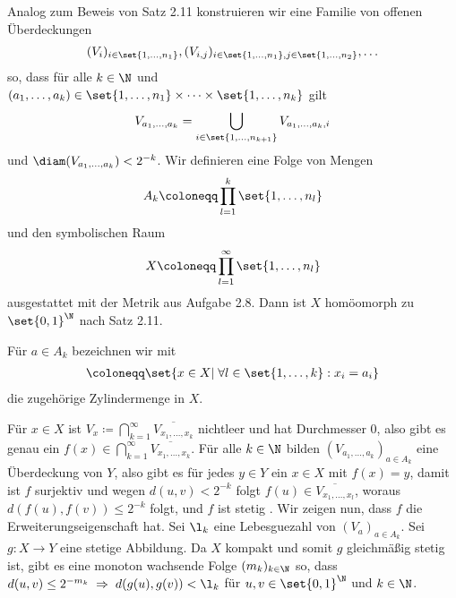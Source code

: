 \begin{beweis}
  Analog zum Beweis von Satz 2.11 konstruieren wir eine Familie von offenen Überdeckungen
  \begin{align*}
    (V_i)_{i \in \set{1, \dots, n_1}}, (V_{i, j})_{i \in \set{1, \dots, n_1}, j \in \set{1, \dots, n_2}}, \dots
  \end{align*}
  so, dass für alle $k \in \N$ und $(a_1, \dots, a_k) \in \set{1, \dots, n_1}\times \dots \times \set{1, \dots, n_k}$ gilt
  \begin{align*}
    V_{a_1, \dots, a_k} = \bigcup_{i \in \set{1, \dots, n_{k+1}}} V_{a_1, \dots, a_k,i}
  \end{align*}
  und $\diam(V_{a_1, \dots, a_k})<2^{-k}$. Wir definieren eine Folge von Mengen
  \begin{align*}
    A_k \coloneqq \prod_{l = 1}^k \set{1, \dots, n_l}
  \end{align*}
  und den symbolischen Raum
  \begin{align*}
    X \coloneqq \prod_{l = 1}^\infty\set{1, \dots, n_l}
  \end{align*}
  ausgestattet mit der Metrik aus Aufgabe 2.8.
  Dann ist $X$ homöomorph zu $\set{0, 1}^\N$ nach Satz 2.11.

  Für $a \in A_k$ bezeichnen wir mit
  \begin{align*}
    [a] \coloneqq \set{x \in X |\; \forall l \in \set{1, \dots, k}: x_i = a_i}
  \end{align*}
  die zugehörige Zylindermenge in $X$.

  Für $x \in X$ ist $V_x \coloneqq \bigcap_{k = 1}^\infty \overline{V_{x_1, \dots, x_k}}$ nichtleer und hat Durchmesser $0$, also gibt es genau ein $f(x) \in \bigcap_{k = 1}^\infty  \overline{V_{x_1, \dots, x_k}}$. Für alle $k \in \N$ bilden $(V_{a_1, \dots, a_k})_{a \in A_k}$ eine Überdeckung von $Y$, also gibt es für jedes $y \in Y$ ein $x \in X$ mit $f(x) = y$, damit ist $f$ surjektiv und wegen $d(u, v) < 2^{-k}$ folgt $f(u) \in \overline{V_{x_1, \dots, x_l}}$, woraus $d(f(u), f(v)) \leq 2^{-k}$ folgt, und $f$ ist stetig .
  Wir zeigen nun, dass $f$ die Erweiterungseigenschaft hat. Sei $\l_k$ eine Lebesguezahl von $(V_a)_{a \in A_k}$. Sei $g: X \to Y$ eine stetige Abbildung. Da $X$ kompakt und somit $g$ gleichmäßig stetig ist, gibt es eine monoton wachsende Folge $(m_k)_{k \in \N}$ so, dass $d(u, v) \leq 2^{-m_k} \; \Rightarrow \; d(g(u), g(v))< \l_k$ für $u, v \in \set{0, 1}^\N$ und $k \in \N$.


\end{beweis}
